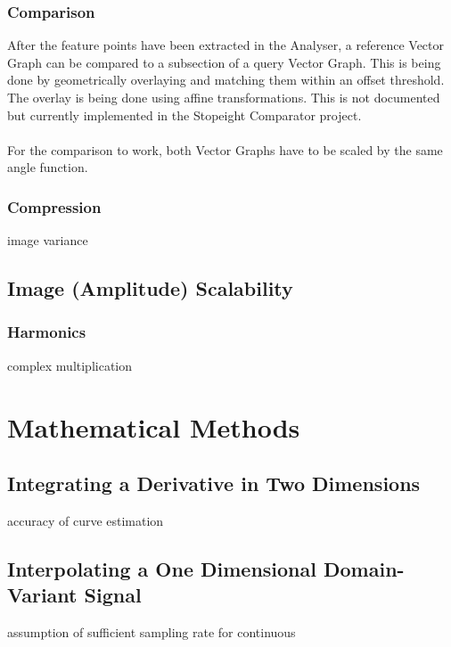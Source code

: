 \documentclass{report}
\begin{document}
\subsection{Comparison}
After the feature points have been extracted in the Analyser, a reference Vector Graph can be compared to a subsection of a query Vector Graph. This is being done by geometrically overlaying and matching them within an offset threshold. The overlay is being done using affine transformations. This is not documented but currently implemented in the Stopeight Comparator project.\\\\
For the comparison to work, both Vector Graphs have to be scaled by the same angle function.
\subsection{Compression}
image variance
\section{Image (Amplitude) Scalability}
\subsection{Harmonics}
complex multiplication

\chapter{Mathematical Methods}
\section{Integrating a Derivative in Two Dimensions}
accuracy of curve estimation
\section{Interpolating a One Dimensional Domain-Variant Signal}
assumption of sufficient sampling rate for continuous

\iffalse
\printbibliography
\fi
{}

\end{document}
